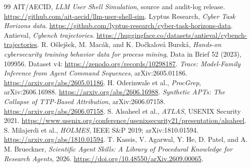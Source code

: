 \documentclass[11pt]{article}
\begin{document}
\begin{thebibliography}{99}\small
{} AIT/AECID, \emph{LLM User Shell Simulation}, source and audit-log release. \url{https://github.com/ait-aecid/llm-user-shell-sim}.
 Lyptus Research, \emph{Cyber Task Horizons data}. \url{https://github.com/lyptus-research/cyber-task-horizons-data}.
 Antieval, \emph{Cybench trajectories}. \url{https://huggingface.co/datasets/antieval/cybench-trajectories}.
 R. O\v{s}lej\v{s}ek, M. Mac\'ak, and K. Do\v{c}kalov\'a Bursk\'a, \emph{Hands-on cybersecurity training behavior data for process mining}, Data in Brief 52 (2023), 109956. Dataset v4: \url{https://zenodo.org/records/10298187}.
 \emph{Trace: Model-Family Inference from Agent Command Sequences}, arXiv:2605.01186. \url{https://arxiv.org/abs/2605.01186}.
 H. Oderinwale et al., \emph{ProcGrep}, arXiv:2606.16988. \url{https://arxiv.org/abs/2606.16988}.
 \emph{Synthetic APTs: The Collapse of TTP-Based Attribution}, arXiv:2606.07158. \url{https://arxiv.org/abs/2606.07158}.
 S. Alsaheel et al., \emph{ATLAS}, USENIX Security 2021. \url{https://www.usenix.org/conference/usenixsecurity21/presentation/alsaheel}.
 S. Milajerdi et al., \emph{HOLMES}, IEEE S\&P 2019; arXiv:1810.01594. \url{https://arxiv.org/abs/1810.01594}.
 T. Kassis, V. Agarwal, Y. He, D. Patel, and A. M. Brueckner, \emph{Scientific Agent Skills: A Library of Procedural Knowledge for Research Agents}, 2026. \url{https://doi.org/10.48550/arXiv.2609.00065}.
\end{thebibliography}
\end{document}
